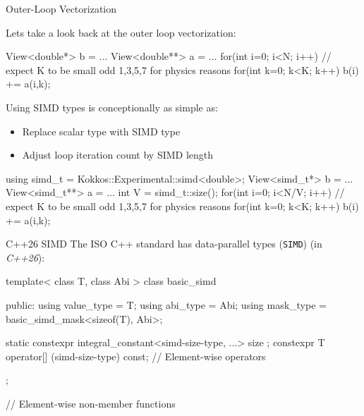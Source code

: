 \begin{frame}[fragile]{Outer-Loop Vectorization}

  Lets take a look back at the outer loop vectorization:
  \begin{code}[linebackgroundcolor={},keywords={for,int}]
  View<double*> b = ...
  View<double**> a = ...
  for(int i=0; i<N; i++) {
    // expect K to be small odd 1,3,5,7 for physics reasons
    for(int k=0; k<K; k++) b(i) += a(i,k);
  }
  \end{code}

  \pause
  Using SIMD types is conceptionally as simple as:
	\begin{itemize}
		\item Replace scalar type with SIMD type
		\item Adjust loop iteration count by SIMD length
	\end{itemize}

  \begin{code}[linebackgroundcolor={},keywords={for,int}]
  using simd_t = Kokkos::Experimental::simd<double>;
  View<simd_t*> b = ...
  View<simd_t**> a = ...
  int V = simd_t::size();
  for(int i=0; i<N/V; i++) {
    // expect K to be small odd 1,3,5,7 for physics reasons
    for(int k=0; k<K; k++) b(i) += a(i,k);
  }
  \end{code}
\end{frame}

\begin{frame}[fragile]{C++26 SIMD}
	The ISO C++ standard has data-parallel types (\texttt{SIMD}) (in \emph{C++26}):

  \begin{code}[linebackgroundcolor={},keywords={template,class,public,using}]
template< class T, class Abi >
class basic_simd {
public:
  using value_type = T;
  using abi_type   = Abi;
  using mask_type  = basic_simd_mask<sizeof(T), Abi>;

  static constexpr integral_constant<simd-size-type, ...> size {};
  constexpr T operator[] (simd-size-type) const;
  // Element-wise operators
};

// Element-wise non-member functions

  \end{code}

\end{frame}

